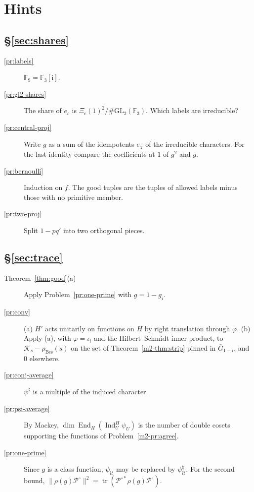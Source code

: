 \documentclass[reqno]{amsart}
\theoremstyle{plain}
\theoremstyle{definition}
\theoremstyle{remark}
\newcommand{\F}{\mathbb{F}}
\newcommand{\Gb}{\bar G}
\newcommand{\Po}{{\mathcal P^\circ}}
\newcommand{\Kc}{\mathcal K}
\newcommand{\Uc}{\mathcal U}
\newcommand{\rB}{\rho_{\mathrm{Bes}}}
\newcommand{\GL}{\mathrm{GL}}
\newcommand{\tr}{\operatorname{tr}}
\newcommand{\End}{\operatorname{End}}
\newcommand{\Ind}{\operatorname{Ind}}
\begin{document}
\section*{Hints}

\subsection*{\S\ref{sec:shares}}
\begin{description}
\item[\ref{pr:labels}] \(\F_9 = \F_3[\mathrm i]\).
\item[\ref{pr:gl2-shares}] The share of \(e_c\) is \(\Xi_c(1)^2/\#\GL_2(\F_3)\).  Which labels are irreducible?
\item[\ref{pr:central-proj}] Write \(g\) as a sum of the idempotents \(e_\chi\) of the irreducible characters.  For the last identity compare the coefficients at \(1\) of \(g^2\) and \(g\).
\item[\ref{pr:bernoulli}] Induction on \(f\).  The good tuples are the tuples of allowed labels minus those with no primitive member.
\item[\ref{pr:two-proj}] Split \(1 - pq'\) into two orthogonal pieces.
\end{description}

\subsection*{\S\ref{sec:trace}}
\begin{description}
\item[Theorem~\ref{thm:good}(a)] Apply Problem~\ref{pr:one-prime} with \(g=1-g_i\).
\item[\ref{pr:conv}] (a) \(H'\) acts unitarily on functions on \(H\) by right translation through \(\varphi\).  (b) Apply (a), with \(\varphi = \iota_i\) and the Hilbert--Schmidt inner product, to \(\Kc_s - \rB(s)\) on the set of Theorem~\ref{m2-thm:strip} pinned in \(\Gb_{1-i}\), and \(0\) elsewhere.
\item[\ref{pr:conj-average}] \(\psi^\natural\) is a multiple of the induced character.
\item[\ref{pr:psi-average}] By Mackey, \(\dim\End_H(\Ind_U^H\psi_U)\) is the number of double cosets supporting the functions of Problem~\ref{m2-pr:agree}.
\item[\ref{pr:one-prime}] Since \(g\) is a class function, \(\psi_{\Uc}\) may be replaced by \(\psi_{\Uc}^\natural\).  For the second bound, \(\lVert\rho(g)\Po\rVert^2 = \tr(\mathcal P^{\circ*}\rho(g)\Po)\).
\end{description}
\end{document}
